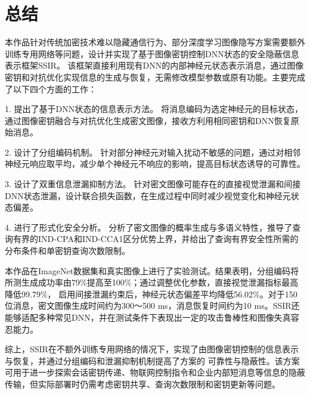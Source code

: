 \section{总结}
本作品针对传统加密技术难以隐藏通信行为、部分深度学习图像隐写方案需要额外训练专用网络等问题，设计并实现了基于图像密钥控制DNN状态的安全隐蔽信息表示框架SSIR。
该框架直接利用现有DNN的内部神经元状态表示消息，通过图像密钥和对抗优化实现信息的生成与恢复，无需修改模型参数或原有功能。主要完成了以下四个方面的工作：

1. 提出了基于DNN状态的信息表示方法。 将消息编码为选定神经元的目标状态，通过图像密钥融合与对抗优化生成密文图像，接收方利用相同密钥和DNN恢复原始消息。

2. 设计了分组编码机制。 针对部分神经元对输入扰动不敏感的问题，通过对相邻神经元响应取平均，减少单个神经元不响应的影响，提高目标状态诱导的可靠性。

3. 设计了双重信息泄漏抑制方法。 针对密文图像可能存在的直接视觉泄漏和间接DNN状态泄漏，设计联合损失函数，在生成过程中同时减少视觉变化和神经元状态偏差。

4. 进行了形式化安全分析。 分析了密文图像的概率生成与多语义特性，推导了查询有界的IND-CPA和IND-CCA1区分优势上界，并给出了查询有界安全性所需的分布条件和单密钥查询次数限制。

本作品在ImageNet数据集和真实图像上进行了实验测试。结果表明，分组编码将所测生成成功率由79\%提高至100\%；通过调整优化参数，直接视觉泄漏指标最高降低99.79\%，
启用间接泄漏约束后，神经元状态偏差平均降低56.02\%。对于150位消息，密文图像生成时间约为300～500 ms，消息恢复时间约为10 ms。SSIR还能够适配多种常见DNN，并在测试条件下表现出一定的攻击鲁棒性和图像失真容忍能力。

综上，SSIR在不额外训练专用网络的情况下，实现了由图像密钥控制的信息表示与恢复，并通过分组编码和泄漏抑制机制提高了方案的
可靠性与隐蔽性。该方案可用于进一步探索会话密钥传递、物联网控制指令和企业内部短消息等信息的隐蔽传输，但实际部署时仍需考虑密钥共享、查询次数限制和密钥更新等问题。